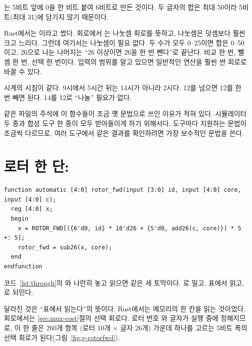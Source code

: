 는 5비트  앞에 0을 한 비트 붙여 6비트로 만든 것이다. 두 글자의 합은 최대 50이라
5비트(최대 31)에 담기지 않기 때문이다.

\Why Rust에서는 이라고 썼다. 회로에서 \code{\%}는 나눗셈 회로를 뜻하고, 나눗셈은 덧셈보다
훨씬 크고 느리다. 그런데 여기서는 나눗셈이 필요 없다. 두 수가 모두 0--25이면 합은 0--50이고, 26으로 나눈
나머지는 ``26 이상이면 26을 한 번 뺀다''로 끝난다. 비교 한 번, 뺄셈 한 번, 선택 한 번이다. 입력의 범위를
알고 있으면 일반적인 연산을 훨씬 싼 회로로 바꿀 수 있다.

\General 시계의 시침이 같다. 9시에서 5시간 뒤는 14시가 아니라 2시다. 12를 넘으면 12를 한 번 빼면 된다.
14를 12로 ``나눌'' 필요가 없다.

\Ours 같은 파일의 주석에 이 함수들이 조금 옛 문법으로 쓰인 이유가 적혀 있다. 시뮬레이터 두 종과 합성 도구
한 종이 모두 받아들이게 하기 위해서다. 도구마다 지원하는 문법이 조금씩 다르므로, 여러 도구에서 같은 결과를
확인하려면 가장 보수적인 문법을 쓴다.

\section{로터 한 단: \texorpdfstring{}{rotor\_fwd}}

\begin{lstlisting}[language=SV,caption={\code{wirings\_pkg.sv}: 회전한 로터를 통과한다.},label={lst:rotorfwd}]
function automatic [4:0] rotor_fwd(input [3:0] id, input [4:0] core, input [4:0] c);
  reg [4:0] x;
  begin
    x = ROTOR_FWD[({6'd0, id} * 10'd26 + {5'd0, add26(c, core)}) * 5 +: 5];
    rotor_fwd = sub26(x, core);
  end
endfunction
\end{lstlisting}

코드~\ref{lst:through}의 와 나란히 놓고 읽으면 같은 세 토막이다. 로
밀고, 표에서 읽고, 로 되민다.

달라진 것은 ``표에서 읽는다''의 뜻이다. Rust에서는 메모리의 한 칸을 읽는 것이었다. 회로에서는
\ref{sec:mux-cost}절의 선택 회로다. 로터 번호 와 글자가 실행 중에 정해지므로, 이 한 줄은 260개 항목
(로터 10개 × 글자 26개) 가운데 하나를 고르는 5비트 폭의 선택 회로가 된다(그림~\ref{fig:g-rotorfwd}).


